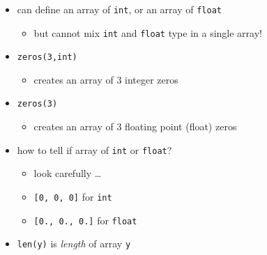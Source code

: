 \documentclass[14pt]{beamer}
\newcommand\red[1]{{\color{red} #1}}
\begin{document}

\begin{frame}[fragile]

\frametitle{}

\begin{itemize}

	\item can define an array of \texttt{int}, or an array of \texttt{float}
	\begin{itemize}
		\item but cannot mix \texttt{int} and \texttt{float} type in a single array!
	\end{itemize}

	\vspace*{2mm}

	\item \texttt{zeros(3,int)}
	
	\vspace*{2mm}
		
	\begin{itemize}
		\item creates an array of $3$ integer zeros
	\end{itemize}
	
	\vspace*{2mm}
		
	\item \texttt{zeros(3)}
	\begin{itemize}
		\item creates an array of $3$ floating point (float) zeros
	\end{itemize}
	
	\vspace*{2mm}
		
	\item how to tell if array of \texttt{int} or \texttt{float}?
	\begin{itemize}
		\item look carefully \ldots
		\item \texttt{[0, 0, 0]} for \texttt{int}
		\item \texttt{[0., 0., 0.]} for \texttt{float}
	\end{itemize}

	\vspace*{2mm}
	
	\item \texttt{len(y)} is \red{\emph{length}} of array \texttt{y}
\end{itemize}

\end{frame}
\end{document}
